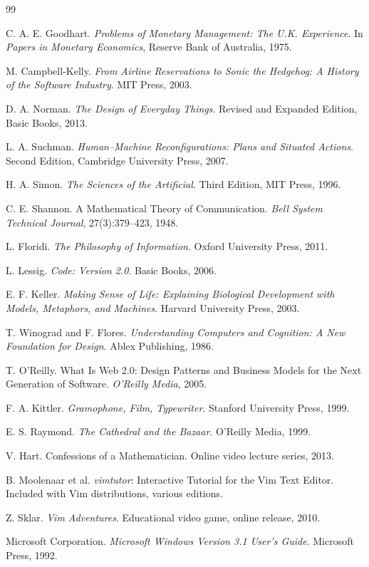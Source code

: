 \documentclass[11pt,oneside]{article}
\begin{document}
\newpage
\begin{thebibliography}{99}

C. A. E. Goodhart.
\textit{Problems of Monetary Management: The U.K. Experience}.
In \textit{Papers in Monetary Economics}, Reserve Bank of Australia, 1975.

M. Campbell-Kelly.
\textit{From Airline Reservations to Sonic the Hedgehog: A History of the Software Industry}.
MIT Press, 2003.

D. A. Norman.
\textit{The Design of Everyday Things}.
Revised and Expanded Edition, Basic Books, 2013.

L. A. Suchman.
\textit{Human--Machine Reconfigurations: Plans and Situated Actions}.
Second Edition, Cambridge University Press, 2007.

H. A. Simon.
\textit{The Sciences of the Artificial}.
Third Edition, MIT Press, 1996.

C. E. Shannon.
A Mathematical Theory of Communication.
\textit{Bell System Technical Journal}, 27(3):379--423, 1948.

L. Floridi.
\textit{The Philosophy of Information}.
Oxford University Press, 2011.

L. Lessig.
\textit{Code: Version 2.0}.
Basic Books, 2006.

E. F. Keller.
\textit{Making Sense of Life: Explaining Biological Development with Models, Metaphors, and Machines}.
Harvard University Press, 2003.

T. Winograd and F. Flores.
\textit{Understanding Computers and Cognition: A New Foundation for Design}.
Ablex Publishing, 1986.

T. O'Reilly.
What Is Web 2.0: Design Patterns and Business Models for the Next Generation of Software.
\textit{O'Reilly Media}, 2005.

F. A. Kittler.
\textit{Gramophone, Film, Typewriter}.
Stanford University Press, 1999.

E. S. Raymond.
\textit{The Cathedral and the Bazaar}.
O'Reilly Media, 1999.

V. Hart.
Confessions of a Mathematician.
Online video lecture series, 2013.

B. Moolenaar et al.
\textit{vimtutor}: Interactive Tutorial for the Vim Text Editor.
Included with Vim distributions, various editions.

Z. Sklar.
\textit{Vim Adventures}.
Educational video game, online release, 2010.

Microsoft Corporation.
\textit{Microsoft Windows Version 3.1 User’s Guide}.
Microsoft Press, 1992.

\end{thebibliography}
\end{document}
